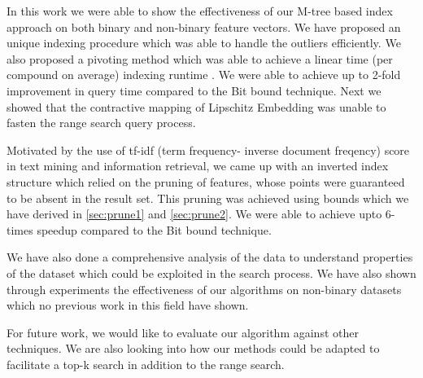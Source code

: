 %
%
In this work we were able to show the effectiveness of our M-tree based index approach on both binary and non-binary feature vectors. We have proposed an unique indexing procedure which was able to handle the outliers efficiently. We also proposed a pivoting method which was able to achieve a linear time (per compound on average) indexing runtime . We were able to achieve up to 2-fold improvement in query time compared to the Bit bound technique. Next we showed that the contractive mapping of Lipschitz Embedding was unable to fasten the range search query process. 

Motivated by the use of tf-idf (term frequency- inverse document freqency) score in text mining and information retrieval, we came up with an inverted index structure which relied on the pruning of features, whose points were guaranteed to be absent in the result set. This pruning was achieved using bounds which we have derived in \autoref{sec:prune1} and \autoref{sec:prune2}. We were able to achieve upto 6-times speedup compared to the Bit bound technique.

We have also done a comprehensive analysis of the data to understand properties of the dataset which could be exploited in the search process. We have also shown through experiments the effectiveness of our algorithms on non-binary datasets which no previous work in this field have shown.
 
For future work, we would like to evaluate our algorithm against other techniques. We are also looking into how our methods could be adapted to facilitate a top-k search in addition to the range search.

% 